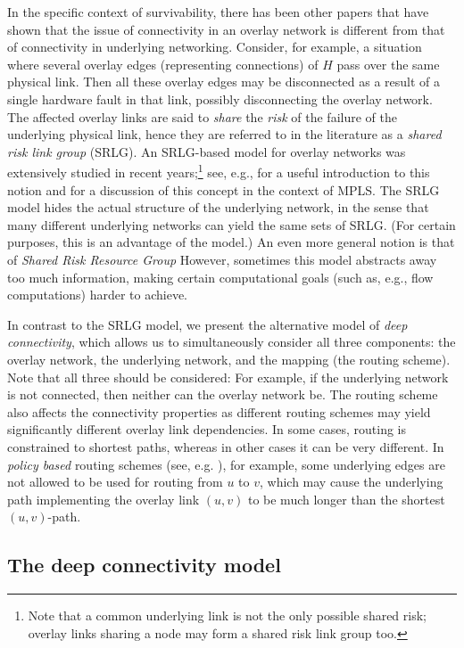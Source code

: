\LongVersion \documentclass[11pt]{article}
\theoremstyle{definition}
\theoremstyle{plain}
\begin{document}
In the specific context of survivability, there has been other papers that
have shown  that the issue of connectivity in an overlay network is different
from that of connectivity in underlying networking.
Consider, for example,
a situation where several overlay edges (representing connections)
of $H$ pass over the same physical link.
Then all these overlay edges may be disconnected as a result of a
single hardware fault in that link, possibly disconnecting the overlay network.
The affected overlay links are said to {\em share} the {\em risk}
of the failure of the underlying physical link, hence they are referred to
in the literature as a \emph{shared risk link group} (SRLG).
An SRLG-based model for overlay networks was extensively studied in recent
years;\footnote{
Note that a common underlying link is not the only possible shared risk;
overlay links sharing a node may form a shared risk link group too.
}
see, e.g., \cite{intro-srlg} for a useful introduction to this notion and
\cite{cisco-srlg} for a discussion of this concept in the context of MPLS.
The SRLG model hides the actual structure of the underlying network, in the
sense that many different underlying networks can yield the same sets of
SRLG.
(For certain purposes, this is an advantage of the model.)
An even more general notion is that of \emph{Shared Risk Resource Group}
However, sometimes this model abstracts away too much information,
making certain computational goals (such as, e.g., flow computations)
harder to achieve.


In contrast to the SRLG model, we present the alternative model of
\emph{deep connectivity}, which allows us to simultaneously consider all three
components: the overlay network, the underlying network, and the mapping (the
routing scheme).
Note that all three should be considered:
For example, if the underlying network is not connected, then neither can the
overlay network be.
The routing scheme also affects the connectivity properties as different
routing schemes may yield significantly different overlay link dependencies.
In some cases, routing is constrained to shortest paths, whereas in other
cases it can be very different.
In \emph{policy based} routing schemes (see, e.g. \cite{CiscoPolicy}), for
example, some underlying edges are not allowed to be used for routing from $u$
to $v$, which may cause the underlying path implementing the overlay link $(u,
v)$ to be much longer than the shortest $(u, v)$-path.

\subsection{The deep connectivity model}
\label{section:Model}
\end{document}

